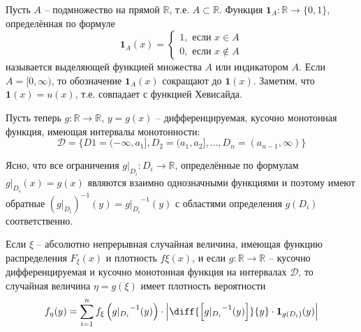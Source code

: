 \begin{definition}
\label{def:14.3}
Пусть $A$ – подмножество на прямой $\mathbb{R}$, т.е. $A \subset
\mathbb{R}$. Функция $\mathbf{1}_A :\mathbb{R} \to \{0, 1\}$, определённая по формуле
\begin{equation*}
	\mathbf{1}_A (x)=\left\{
	\begin{aligned}
		1, \text{ если } x\in A\\
		0, \text{ если } x\notin A
	\end{aligned}
	\right.
\end{equation*}
называется выделяющей функцией множества $A$ или индикатором $A$.
Если $A = [0, \infty)$, то обозначение $\mathbf{1}_A(x)$ сокращают до $\mathbf{1}(x)$. Заметим, что $\mathbf{1}(x) = u(x)$, т.е. совпадает с функцией Хевисайда.	
\end{definition}

\begin{zam}
\label{zam:14.4}
Пусть теперь $g : \mathbb{R} \to \mathbb{R}$, $y = g(x)$ -- дифференцируемая, кусочно монотонная функция, имеющая интервалы монотонности:
\begin{equation*}
	\mathcal{D}=\{D1=(-\infty, a_1], D_2 = (a_1 , a_2 ], \ldots , D_n = (a_{n-1} , \infty)\} 
\end{equation*}

Ясно, что все ограничения $g|_{D_i} : D_i \to \mathbb{R}$, определённые по формулам $g|_{D_i}(x)=g(x)$ являются взаимно однозначными функциями и поэтому имеют обратные $\left(g|_{D_i}\right)^{-1}(y)={g|_{D_i}}^{-1}(y)$ с областями определения $g(D_i)$ соответственно.
\end{zam}

\begin{theorem}
	\label{th:14.5}
Если $\xi $ -- абсолютно непрерывная случайная величина, имеющая функцию распределения $F_\xi (x)$ и плотность $f\xi (x)$, и если $g : \mathbb{R} \to \mathbb{R}$ -- кусочно дифференцируемая и кусочно монотонная функция на интервалах $\mathcal{D}$, то случайная величина $\eta = g(\xi)$ имеет плотность вероятности
\begin{equation*}
	f_\eta(y)=\sum\limits_{i=1}^n f_\xi\left(
		{g|_{D_i}}^{-1}(y)
	\right)\cdot
	\left|
		\diff{\left[ {g|_{D_i}}^{-1}(y) \right]}{y}\cdot\mathbf{1}_{g(D_i)}(y)
	\right|
\end{equation*}

\end{theorem}
